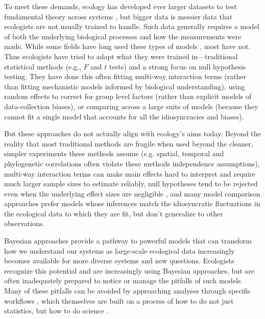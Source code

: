 \documentclass[11pt]{article}
\begin{document}
{%
To meet these demands, ecology has developed ever larger datasets to test fundamental theory across systems \citep{Hampton2013}, but bigger data is messier data that ecologists are  not usually trained to handle. Such data generally requires a model of both the underlying biological processes and how the measurements were made. While some fields have long used these types of models \citep[generally in fields focused on inferring population sizes of things people want to eat or manage,][]{muthuku2008,zheng2007,trijoulet2018,strinella2020potential}, most have not. Thus ecologists have tried to adapt what they were trained in---traditional statistical methods (e.g., $F$ and $t$ tests) and a strong focus on null hypothesis testing. They have done this often fitting multi-way interaction terms (rather than fitting mechanistic models informed by biological understanding), using random effects to correct for group level factors (rather than explicit models of data-collection biases), or comparing across a large suite of models (because they cannot fit a single model that accounts for all the idiosyncracies and biases). %

But these approaches do not actually align with ecology's aims today. Beyond the reality that most traditional methods are fragile when used beyond the cleaner, simpler experiments these methods assume (e.g. spatial, temporal and phylogenetic correlations often violate these methods independence assumptions), multi-way interaction terms can make main effects hard to interpret and require much larger sample sizes to estimate reliably, null hypotheses tend to be rejected even when the underlying effect sizes are negligible \citep{gelmanhill,muff2022rewriting}, and many model comparison approaches prefer models whose inferences match the idiosyncratic fluctuations in the ecological data to which they are fit, but don’t generalize to other observations.

Bayesian approaches provide a pathway to powerful models that can transform how we understand our systems as large-scale ecological data increasingly becomes available for more diverse systems and new questions. Ecologists recognize this potential and are increasingly using Bayesian approaches, but are often inadequately prepared to notice or manage the pitfalls of such models. Many of these pitfalls can be avoided by approaching analyses through specific workflows \citep{betanworkflow,grinsztajn2021,vandeschoot2021}, which themselves are built on a process of how to do not just statistics, but how to do science \citep{box1976science}. %

}
\end{document}
